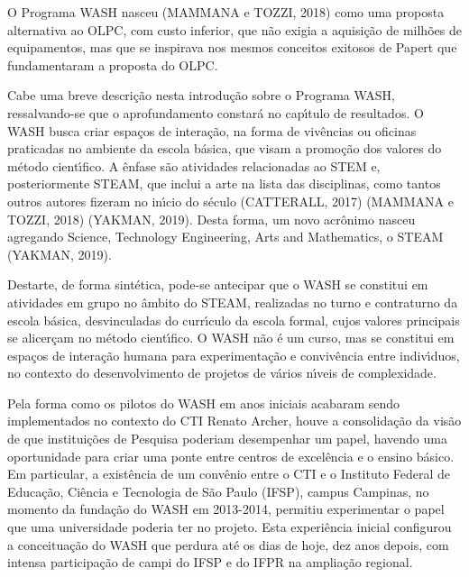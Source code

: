 \documentclass[
12pt,		%
openright,	%
twoside,  %
a4paper,			%
chapter=TITLE,		%
english,			%
french,				%
spanish,			%
brazil				%
]{USPSC-classe/USPSC}
\begin{document}
O Programa WASH nasceu  (MAMMANA e TOZZI, 2018)  como uma proposta alternativa ao OLPC, com custo inferior, que n\~ao exigia a aquisi\c{c}\~ao de milh\~oes de equipamentos, mas que se inspirava nos mesmos conceitos exitosos de Papert que fundamentaram a proposta do OLPC.










Cabe uma breve descri\c{c}\~ao nesta introdu\c{c}\~ao sobre o Programa WASH, ressalvando-se que o aprofundamento constar\'a no cap\'{\i}tulo de resultados. O WASH busca criar espa\c{c}os de intera\c{c}\~ao, na forma de  viv\^encias ou oficinas praticadas no ambiente da escola b\'asica, que visam a promo\c{c}\~ao dos valores do m\'etodo cient\'{\i}fico. A \^enfase s\~ao atividades relacionadas ao STEM e, posteriormente STEAM, que inclui a arte na lista das disciplinas, como tantos outros autores fizeram no in\'{\i}cio do s\'eculo  (CATTERALL, 2017) (MAMMANA e TOZZI, 2018)  (YAKMAN, 2019). Desta forma, um novo acr\^onimo nasceu agregando Science, Technology Engineering, Arts and Mathematics, o STEAM  (YAKMAN, 2019).










Destarte, de forma sint\'etica, pode-se antecipar que o WASH se constitui em atividades em grupo no \^ambito do STEAM, realizadas no turno e contraturno da escola b\'asica, desvinculadas do curr\'{\i}culo da escola formal, cujos valores principais se alicer\c{c}am no m\'etodo cient\'{\i}fico. O WASH n\~ao \'e um curso, mas se constitui em espa\c{c}os de intera\c{c}\~ao humana para experimenta\c{c}\~ao e conviv\^encia entre indiv\'{\i}duos, no contexto do desenvolvimento de projetos de v\'arios n\'{\i}veis de complexidade.










Pela forma como os pilotos do WASH em anos iniciais acabaram sendo implementados no contexto do CTI Renato Archer, houve a consolida\c{c}\~ao da vis\~ao de que institui\c{c}\~oes de Pesquisa poderiam desempenhar um papel, havendo uma oportunidade para criar uma ponte entre centros de excel\^encia e o ensino b\'asico. Em particular, a exist\^encia de um conv\^enio entre o CTI e o Instituto Federal de Educa\c{c}\~ao, Ci\^encia e Tecnologia de S\~ao Paulo (IFSP), campus Campinas, no momento da funda\c{c}\~ao do WASH em 2013-2014, permitiu experimentar o papel que uma universidade poderia ter no projeto. Esta experi\^encia inicial configurou a conceitua\c{c}\~ao do WASH que perdura at\'e os dias de hoje, dez anos depois, com intensa participa\c{c}\~ao de campi do IFSP e do IFPR na amplia\c{c}\~ao regional.
\end{document}
